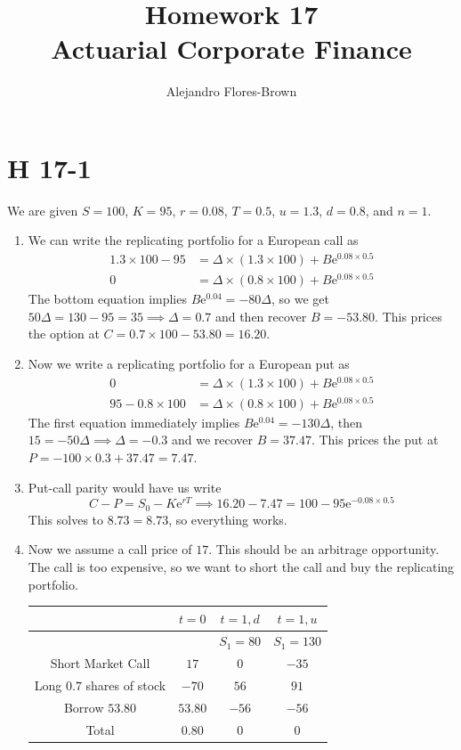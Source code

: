 \documentclass[12pt, letterpaper]{article}
\title{Homework 17 \\ Actuarial Corporate Finance}
\author{Alejandro Flores-Brown}
\newcommand{\e}{\mathrm{e}}
\begin{document}
    \maketitle

    \section{H 17-1}

    We are given \(S = 100\), \(K = 95\), \(r = 0.08\), \(T = 0.5\), \(u = 1.3\), \(d = 0.8\), and \(n = 1\).

    \begin{enumerate}
    \item We can write the replicating portfolio for a European call as
    \begin{align*}
    1.3 \times 100 - 95 &= \Delta \times (1.3 \times 100) + B \e^{0.08 \times 0.5} \\
    0 &= \Delta \times (0.8 \times 100) + B \e^{0.08 \times 0.5}
    \end{align*}
    The bottom equation implies \(B \e^{0.04} = - 80 \Delta\), so we get \(50 \Delta = 130 - 95 = 35 \implies \Delta = 0.7\) and then recover \(B = -53.80\). This prices the option at \( C = 0.7 \times 100 - 53.80 = 16.20  \).
    \item Now we write a replicating portfolio for a European put as
    \begin{align*}
    0 &= \Delta \times (1.3 \times 100) + B \e^{0.08 \times 0.5} \\
    95 - 0.8 \times 100 &= \Delta \times (0.8 \times 100) + B \e^{0.08 \times 0.5}
    \end{align*}
    The first equation immediately implies \(B \e^{0.04} = -130 \Delta\), then \(15 = -50 \Delta \implies \Delta = - 0.3\) and we recover \(B = 37.47\). This prices the put at \(P = - 100 \times 0.3 + 37.47 = 7.47\). 
    \item Put-call parity would have us write
    \[ C - P = S_0 - K \e^{rT} \implies 16.20 - 7.47 = 100 - 95 \e^{-0.08 \times 0.5}       \]
    This solves to \(8.73 = 8.73\), so everything works.

    \item Now we assume a call price of \(17\). This should be an arbitrage opportunity. The call is too expensive, so we want to short the call and buy the replicating portfolio.

    \begin{tabular}{|c|c|c|c|}
        \hline
         & \(t = 0\) & \(t = 1, d\) & \(t = 1, u\) \\
         \hline
         & & \(S_1 = 80\) & \(S_1 = 130\) \\
         \hline
         Short Market Call & \(17\) & \(0\) & \(-35\) \\
         \hline
         Long \(0.7\) shares of stock & \(-70\) & \(56\) & \(91\) \\
         \hline
         Borrow \(53.80\) & \(53.80\) & \(-56\) & \(-56\) \\
         \hline
         Total & \(0.80\) & \(0\) & \(0\) \\
         \hline
    \end{tabular}


\end{enumerate}
\end{document}
